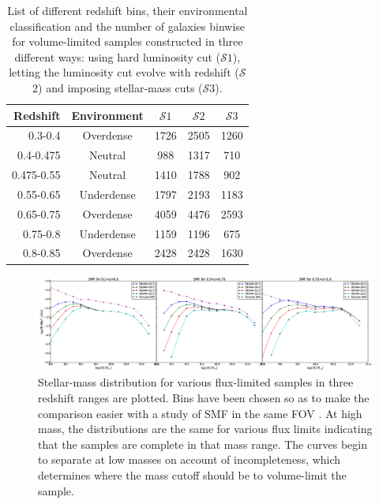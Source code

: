 \documentclass[twocolumn,useAMS,usenatbib]{mn2e}
\newcommand{\s}{\ensuremath{\mathcal{S}}}
\begin{document}
\begin{table} 
\centering
\begin{tabular}{|r|c|c|c|c|}
 \hline
 Redshift & Environment & \s$1$ & \s$2$ & \s$3$ \\
 \hline
 0.3-0.4 & Overdense & 1726 & 2505 & 1260 \\
 0.4-0.475 & Neutral & 988 & 1317 & 710 \\
 0.475-0.55 & Neutral & 1410 & 1788 & 902 \\
 0.55-0.65 & Underdense & 1797 & 2193 & 1183 \\
 0.65-0.75 & Overdense & 4059 & 4476 & 2593 \\
 0.75-0.8 & Underdense & 1159 & 1196 & 675 \\
 0.8-0.85 & Overdense & 2428 & 2428 & 1630 \\
\end{tabular}
\caption{List of different redshift bins, their environmental classification and the number of galaxies binwise for volume-limited samples constructed in three different ways: using hard luminosity cut (\s$1$), letting the luminosity cut evolve with redshift (\s$2$) and imposing stellar-mass cuts (\s$3$).}
\label{table:GalaxyCounts}
\end{table}

\begin{figure}
 \centering
 \includegraphics[width=2.4\columnwidth]{figure_generated}
 \caption{Stellar-mass distribution for various flux-limited samples in three redshift ranges are plotted. Bins have been chosen so as to make the comparison easier with 
          a study of SMF in the same FOV \citep{Tomczak_SMF}. At high mass, the distributions are the same for various flux limits indicating that the samples are complete in that mass range. The curves begin to separate at low masses on account of incompleteness, which determines where the mass cutoff should be to volume-limit the sample.}
 \label{fig:smf}
\end{figure}
\end{document}
